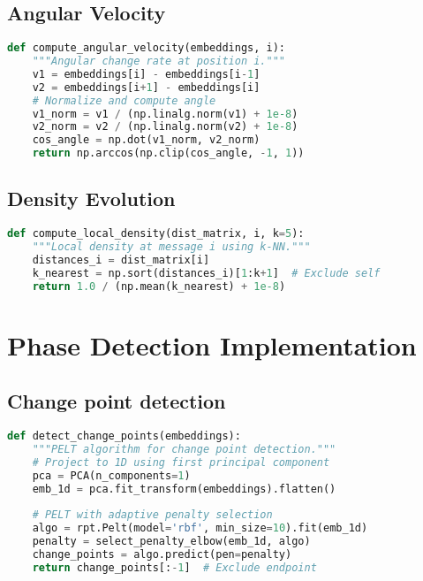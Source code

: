 \documentclass[11pt,letterpaper]{article}
\begin{document}
\subsection{Angular Velocity}
\label{app:geometric-signatures-angluar-velocity}
\begin{lstlisting}[language=Python, basicstyle=\small]
def compute_angular_velocity(embeddings, i):
    """Angular change rate at position i."""
    v1 = embeddings[i] - embeddings[i-1]
    v2 = embeddings[i+1] - embeddings[i]
    # Normalize and compute angle
    v1_norm = v1 / (np.linalg.norm(v1) + 1e-8)
    v2_norm = v2 / (np.linalg.norm(v2) + 1e-8)
    cos_angle = np.dot(v1_norm, v2_norm)
    return np.arccos(np.clip(cos_angle, -1, 1))
\end{lstlisting}

\subsection{Density Evolution}
\label{app:geometric-signatures-density-evolution}
\begin{lstlisting}[language=Python, basicstyle=\small]
def compute_local_density(dist_matrix, i, k=5):
    """Local density at message i using k-NN."""
    distances_i = dist_matrix[i]
    k_nearest = np.sort(distances_i)[1:k+1]  # Exclude self
    return 1.0 / (np.mean(k_nearest) + 1e-8)
\end{lstlisting}

\section{Phase Detection Implementation}
\label{app:phase-detection}

\subsection{Change point detection}
\label{app:phase-detection-change-point}
\begin{lstlisting}[language=Python]
def detect_change_points(embeddings):
    """PELT algorithm for change point detection."""
    # Project to 1D using first principal component
    pca = PCA(n_components=1)
    emb_1d = pca.fit_transform(embeddings).flatten()
    
    # PELT with adaptive penalty selection
    algo = rpt.Pelt(model='rbf', min_size=10).fit(emb_1d)
    penalty = select_penalty_elbow(emb_1d, algo)
    change_points = algo.predict(pen=penalty)
    return change_points[:-1]  # Exclude endpoint
\end{lstlisting}
\end{document}
